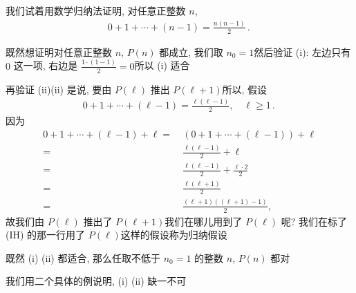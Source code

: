 \begin{example}
    我们试着用数学归纳法证明, 对任意正整数 $n$,
    \begin{align*}
        0 + 1 + \cdots + (n - 1) = \frac{n(n-1)}{2} \period \tag*{$P(n) \colon$}
    \end{align*}

    既然想证明对任意正整数 $n$, $P(n)$ 都成立, 我们取 $n_0 = 1$\period 然后验证 (i): 左边只有 $0$ 这一项, 右边是 $\frac{1 \cdot (1-1)}{2} = 0$\period 所以 (i) 适合\period

    再验证 (ii)\period (ii) 是说, 要由 $P(\ell)$ 推出 $P(\ell + 1)$\period 所以, 假设
    \begin{align*}
        0 + 1 + \cdots + (\ell - 1) = \frac{\ell(\ell-1)}{2}, \quad \ell \geq 1 \period
    \end{align*}
    因为
    \begin{align*}
        0 + 1 + \cdots + (\ell - 1) + \ell
        = \  & (0 + 1 + \cdots + (\ell - 1)) + \ell            \\
        = \  & \frac{\ell(\ell-1)}{2} + \ell \tag*{(IH)}       \\
        = \  & \frac{\ell(\ell-1)}{2} + \frac{\ell \cdot 2}{2} \\
        = \  & \frac{\ell(\ell+1)}{2}                          \\
        = \  & \frac{(\ell+1)((\ell+1) - 1)}{2},
    \end{align*}
    故我们由 $P(\ell)$ 推出了 $P(\ell + 1)$\period 我们在哪儿用到了 $P(\ell)$ 呢? 我们在标了 (IH) 的那一行用了 $P(\ell)$\period 这样的假设称为归纳假设 \period

    既然 (i) (ii) 都适合, 那么任取不低于 $n_0=1$ 的整数 $n$, $P(n)$ 都对\period
\end{example}

我们用二个具体的例说明, (i) (ii) 缺一不可\period

